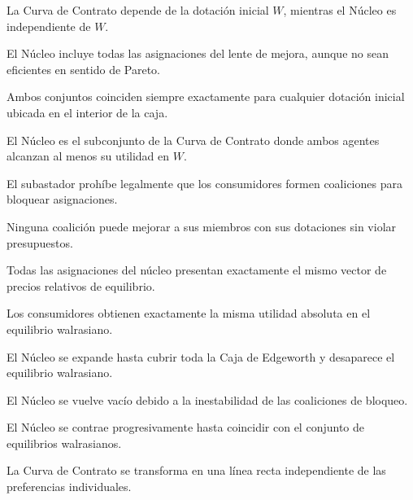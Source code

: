 \begin{opts}
    \item La Curva de Contrato depende de la dotación inicial $W$, mientras el Núcleo es independiente de $W$.
    \item El Núcleo incluye todas las asignaciones del lente de mejora, aunque no sean eficientes en sentido de Pareto.
    \item Ambos conjuntos coinciden siempre exactamente para cualquier dotación inicial ubicada en el interior de la caja.
    \item El Núcleo es el subconjunto de la Curva de Contrato donde ambos agentes alcanzan al menos su utilidad en $W$.
\end{opts}

\begin{opts}
    \item El subastador prohíbe legalmente que los consumidores formen coaliciones para bloquear asignaciones.
    \item Ninguna coalición puede mejorar a sus miembros con sus dotaciones sin violar presupuestos.
    \item Todas las asignaciones del núcleo presentan exactamente el mismo vector de precios relativos de equilibrio.
    \item Los consumidores obtienen exactamente la misma utilidad absoluta en el equilibrio walrasiano.
\end{opts}

\begin{opts}
    \item El Núcleo se expande hasta cubrir toda la Caja de Edgeworth y desaparece el equilibrio walrasiano.
    \item El Núcleo se vuelve vacío debido a la inestabilidad de las coaliciones de bloqueo.
    \item El Núcleo se contrae progresivamente hasta coincidir con el conjunto de equilibrios walrasianos.
    \item La Curva de Contrato se transforma en una línea recta independiente de las preferencias individuales.
\end{opts}

